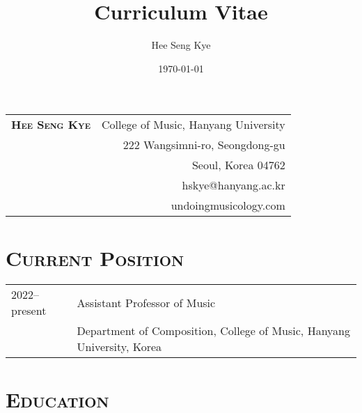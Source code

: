 \documentclass[letter,11pt,draft]{article}
\title{Curriculum Vitae}
\author{Hee Seng Kye}
\date{\today}
\begin{document}
  \renewcommand{\headrulewidth}{0pt}
  \fancyhf{}
  \fancyfoot[RE,RO]{\small \thepage}
  
  \raggedright \parindent=15pt
  
  \hspace*{-0.8cm}
  \begin{tabular}{p{10.31cm} r}
    {\Large \textsc{\textbf{Hee Seng Kye}}} & College of Music, Hanyang
    University\\
    & 222 Wangsimni-ro, Seongdong-gu\\
    & Seoul, Korea 04762\\
    & hskye@hanyang.ac.kr\\
    & undoingmusicology.com
  \end{tabular}
  
  \vspace{10mm}
  
  \section*{\textsc{Current Position}}
  
  \hspace*{-0.25cm}
  \begin{tabular}{p{2.5cm} l}
    2022--present & Assistant Professor of Music\\
    & Department of Composition, College of Music, Hanyang University, Korea
  \end{tabular}
  
  \vspace*{2.5mm}
  
  \section*{\textsc{Education}}
  
\end{document}
